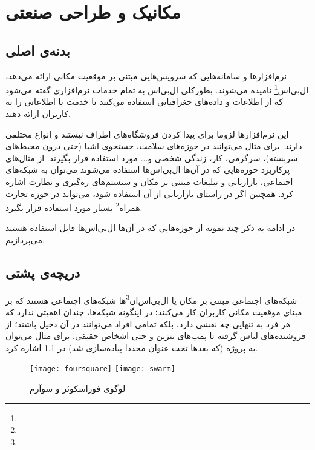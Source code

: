 \chapter{مکانیک و طراحی صنعتی}

\section{بدنه‌ی اصلی}

نرم‌افزارها و سامانه‌هایی که سرویس‌هایی مبتنی بر موقعیت مکانی ارائه می‌دهد، ال‌بی‌اس\footnote{} نامیده می‌شوند. بطورکلی ال‌بی‌اس به تمام خدمات نرم‌افزاری گفته می‌شود که از اطلاعات و داده‌های جغرافیایی استفاده می‌کنند تا خدمت یا اطلاعاتی را به کاربران ارائه دهند\cite{hist:1}.

این نرم‌افزارها لزوما برای پیدا کردن فروشگاه‌های اطراف نیستند و انواع مختلفی دارند. برای مثال می‌توانند در حوزه‌های سلامت، جستجوی اشیا (حتی درون محیط‌های سربسته)، سرگرمی، کار، زندگی شخصی و... مورد استفاده قرار بگیرند. از مثال‌های پرکاربرد حوزه‌هایی که در آن‌ها ال‌بی‌اس‌ها استفاده می‌شوند می‌توان به شبکه‌های اجتماعی، بازاریابی و تبلیغات مبتنی بر مکان و سیستم‌های ره‌گیری و نظارت اشاره کرد. همچنین اگر در راستای بازاریابی از آن استفاده شود، می‌تواند در حوزه تجارت همراه\footnote{} بسیار مورد استفاده قرار بگیرد\cite{hist:1}.

در ادامه به ذکر چند نمونه از حوزه‌هایی که در آن‌ها ال‌بی‌اس‌ها قابل استفاده هستند می‌پردازیم.

\section{دریچه‌ی پشتی}


شبکه‌های اجتماعی مبتنی بر مکان یا ال‌بی‌اس‌ان‌\footnote{}ها شبکه‌های اجتماعی هستند که بر مبنای موقعیت مکانی کاربران کار می‌کنند؛ در اینگونه شبکه‌ها، چندان اهمیتی ندارد که هر فرد به تنهایی چه نقشی دارد، بلکه تمامی افراد می‌توانند در آن دخیل باشند؛ از فروشنده‌های لباس گرفته تا پمپ‌های بنزین و حتی اشخاص حقیقی. برای مثال می‌توان به پروژه \cite{hist:2} (که بعدها تحت عنوان \cite{hist:3} مجددا پیاده‌سازی شد) در \cref{fig:foursquare} اشاره کرد.

\begin{figure}[b]
	\centering
	\texttt{[image: foursquare]}
	\texttt{[image: swarm]}
	\caption{لوگوی فوراسکوئر و سوآرم}
	\label{fig:foursquare}
\end{figure}

\newpage

